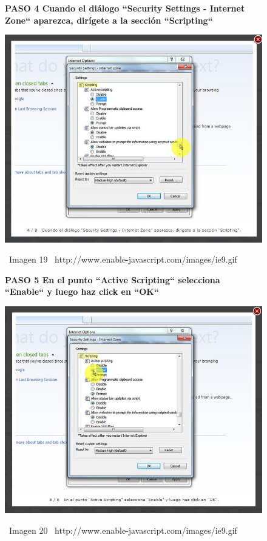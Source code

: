 \documentclass[11pt]{article} %
\begin{document}
\begin{figure}
\begin{center}

\begin{center}
\bf PASO 4
Cuando el diálogo ``Security Settings - Internet Zone`` aparezca, dirígete a la sección ``Scripting``

\includegraphics[height=8 cm, width=8 cm] {imagenes/explorer 04.jpg}
\end{center}
\ Imagen 19
\ {http://www.enable-javascript.com/images/ie9.gif }

\begin{center}
\bf PASO 5
En el punto ``Active Scripting`` selecciona ``Enable`` y luego haz click en ``OK``

\includegraphics[height=8 cm, width=8 cm] {imagenes/explorer 05.jpg}
\end{center}
\ Imagen 20
\ {http://www.enable-javascript.com/images/ie9.gif }
\newline

\end{center}
\end{figure}
\end{document}
